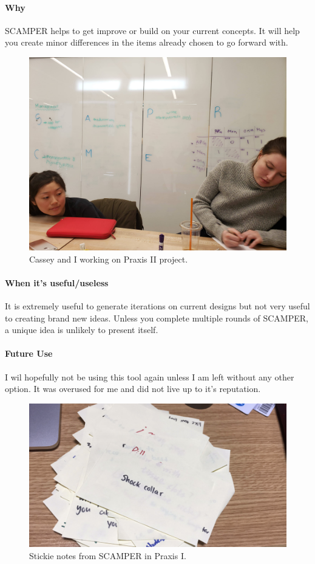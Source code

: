 \documentclass[paper=a4, fontsize=11pt]{article} %
\begin{document}
            \paragraph{Why}
            SCAMPER helps to get improve or build on your current concepts. It will help you create minor differences in the items already chosen to go forward with. 
            \begin{figure}[H]
                \centering
	            \includegraphics[width=0.8\linewidth]{scamper2.jpg}
	            \caption{Cassey and I working on Praxis II project.}
            \end{figure}
            \paragraph{When it's useful/useless} It is extremely useful to generate iterations on current designs but not very useful to creating brand new ideas. Unless you complete multiple rounds of SCAMPER, a unique idea is unlikely to present itself. 
            \paragraph{Future Use} I wil hopefully not be using this tool again unless I am left without any other option. It was overused for me and did not live up to it's reputation. 

            \begin{figure}[H]
                \centering
	            \includegraphics[width=0.8\linewidth]{scamper1.png}
	            \caption{Stickie notes from SCAMPER in Praxis I.}
            \end{figure}
            
\end{document}
